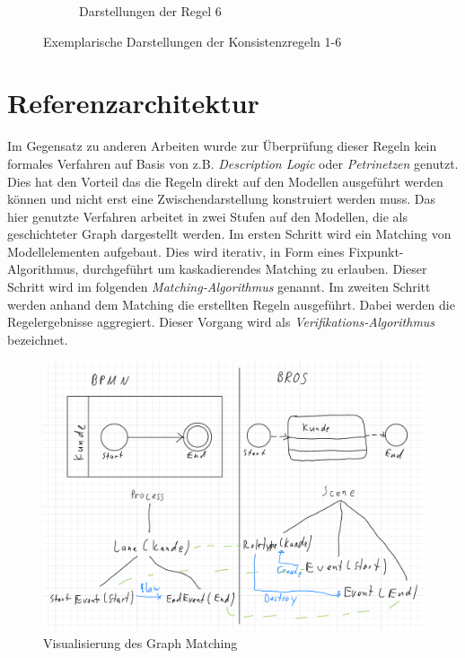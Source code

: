 \begin{figure}
\begin{subfigure}{0.4\textwidth}
        \caption{Darstellungen der Regel 6}%
        \label{fig:ruleExample6}
    \end{subfigure}
    \caption{Exemplarische Darstellungen der Konsistenzregeln 1-6}%
    \label{fig:pizzaBrosSteps}
\end{figure}

\section{Referenzarchitektur}

Im Gegensatz zu anderen Arbeiten wurde zur Überprüfung dieser Regeln kein formales Verfahren auf Basis von z.B. \emph{Description Logic} oder \emph{Petrinetzen} genutzt.
Dies hat den Vorteil das die Regeln direkt auf den Modellen ausgeführt werden können und nicht erst eine Zwischendarstellung konstruiert werden muss.
Das hier genutzte Verfahren arbeitet in zwei Stufen auf den Modellen, die als geschichteter Graph dargestellt werden.
Im ersten Schritt wird ein Matching von Modellelementen aufgebaut.
Dies wird iterativ, in Form eines Fixpunkt-Algorithmus, durchgeführt um kaskadierendes Matching zu erlauben.
Dieser Schritt wird im folgenden \emph{Matching-Algorithmus} genannt.
Im zweiten Schritt werden anhand dem Matching die erstellten Regeln ausgeführt.
Dabei werden die Regelergebnisse aggregiert.
Dieser Vorgang wird als \emph{Verifikations-Algorithmus} bezeichnet.

\begin{figure}
    \centering
    \includegraphics[width=\textwidth,keepaspectratio]{../images/ModelToGraph.pdf}%
    \caption{Visualisierung des Graph Matching}%
    \label{fig:ModelToGraph}
\end{figure}

